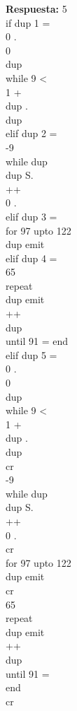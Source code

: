\documentclass[conference]{IEEEtran}
\begin{document}
\begin{enumerate}
\begin{center}
	\textbf{Respuesta: } 5 \\ if dup 1 = \\  0 . \\  0 \\  dup \\ while 9 < \\ 1 + \\ dup  . \\ dup \\ elif dup 2 = \\ -9 \\  while dup \\ dup S. \\ ++ \\ 0 . \\ elif dup 3 = \\ for 97 upto 122 \\ dup emit \\ elif dup 4 = \\ 65 \\ repeat \\ dup emit \\  ++ \\ dup \\ until 91 = end \\ elif dup 5 = \\ 0 . \\ 0 \\  dup \\ while 9 < \\ 1 + \\ dup . \\ dup \\ cr \\ -9 \\  while dup \\ dup S. \\ ++ \\ 0 . \\ cr \\ for 97 upto 122 \\ dup emit \\ cr \\ 65 \\  repeat \\  dup emit \\  ++ \\  dup \\  until 91 = \\ end \\  cr \\
	\end{center}
	

\end{enumerate}
\end{document}
